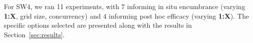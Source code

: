 %
For SW4, we ran 11 experiments, with 7 informing in situ encumbrance (varying \textbf{1:X}, grid size, concurrency) and 4 informing post hoc efficacy (varying \textbf{1:X}).
%
The specific options selected are presented along with the results in Section~\ref{sec:results}. 
%
